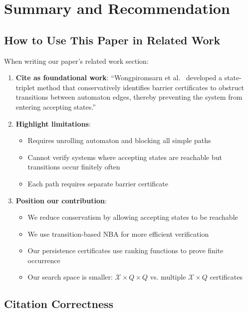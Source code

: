 \documentclass{article}
\begin{document}
\section{Summary and Recommendation}

\subsection{How to Use This Paper in Related Work}

When writing our paper's related work section:

\begin{enumerate}
    \item \textbf{Cite as foundational work}: ``Wongpiromsarn et al.~\cite{wongpiromsarn2015automata} developed a state-triplet method that conservatively identifies barrier certificates to obstruct transitions between automaton edges, thereby preventing the system from entering accepting states.''

    \item \textbf{Highlight limitations}:
    \begin{itemize}
        \item Requires unrolling automaton and blocking all simple paths
        \item Cannot verify systems where accepting states are reachable but transitions occur finitely often
        \item Each path requires separate barrier certificate
    \end{itemize}

    \item \textbf{Position our contribution}:
    \begin{itemize}
        \item We reduce conservatism by allowing accepting states to be reachable
        \item We use transition-based NBA for more efficient verification
        \item Our persistence certificates use ranking functions to prove finite occurrence
        \item Our search space is smaller: $\mathcal{X} \times Q \times Q$ vs. multiple $\mathcal{X} \times Q$ certificates
    \end{itemize}
\end{enumerate}

\subsection{Citation Correctness}
\end{document}
